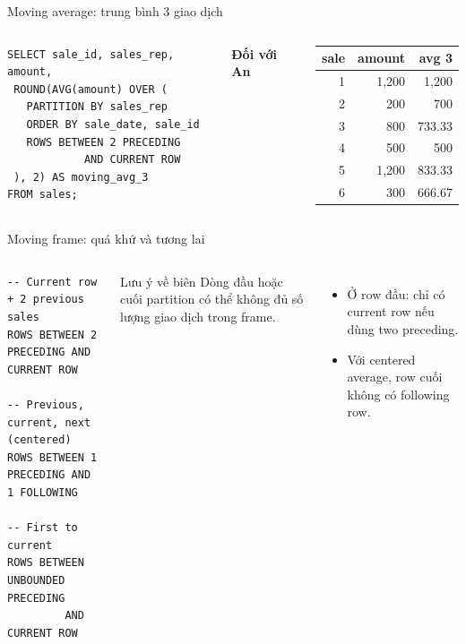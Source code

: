 \documentclass[aspectratio=169,11pt]{beamer}
\begin{document}
\begin{frame}[fragile]{Moving average: trung bình 3 giao dịch}
\begin{columns}[T,onlytextwidth]
\begin{lstlisting}[basicstyle=\ttfamily\fontsize{8.1}{9.299999999999999}\selectfont]
SELECT sale_id, sales_rep, amount,
 ROUND(AVG(amount) OVER (
   PARTITION BY sales_rep
   ORDER BY sale_date, sale_id
   ROWS BETWEEN 2 PRECEDING
            AND CURRENT ROW
 ), 2) AS moving_avg_3
FROM sales;
\end{lstlisting}

\textbf{Đối với An}
\begin{center}
\renewcommand{\arraystretch}{1.18}
\begin{tabular}{rrr}
\toprule
sale & amount & avg 3 \\
\midrule
1 & 1,200 & 1,200 \\
2 & 200 & 700 \\
3 & 800 & 733.33 \\
4 & 500 & 500 \\
5 & 1,200 & 833.33 \\
6 & 300 & 666.67 \\
\bottomrule
\end{tabular}
\end{center}
\end{columns}
\end{frame}

\begin{frame}[fragile]{Moving frame: quá khứ và tương lai}

\begin{columns}[T,onlytextwidth]
\begin{lstlisting}[basicstyle=\ttfamily\fontsize{8.2}{9.399999999999999}\selectfont]
-- Current row + 2 previous sales
ROWS BETWEEN 2 PRECEDING AND CURRENT ROW

-- Previous, current, next (centered)
ROWS BETWEEN 1 PRECEDING AND 1 FOLLOWING

-- First to current
ROWS BETWEEN UNBOUNDED PRECEDING
         AND CURRENT ROW
\end{lstlisting}
\begin{block}{Lưu ý về biên}
Dòng đầu hoặc cuối partition có thể không đủ số lượng giao dịch trong frame.
\end{block}
\begin{itemize}
\item Ở row đầu: chỉ có current row nếu dùng two preceding.
\item Với centered average, row cuối không có following row.
\end{itemize}
\end{columns}

\end{frame}
\end{document}

